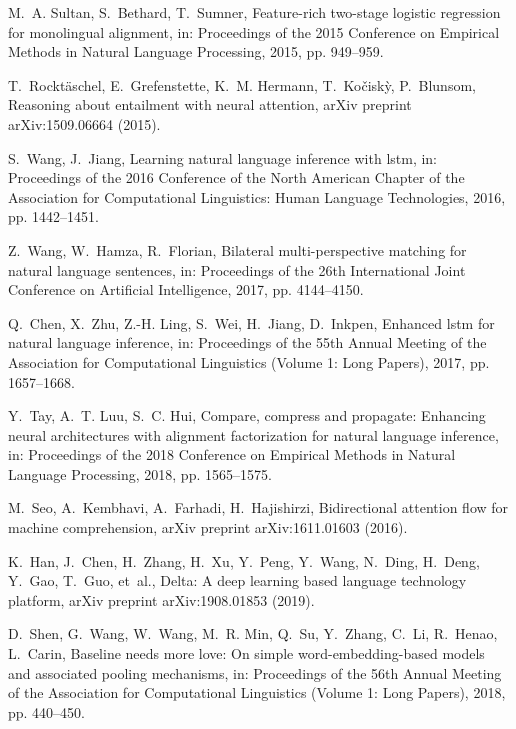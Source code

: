 \documentclass[review]{elsarticle}
\begin{document}
\begin{thebibliography}{10}
M.~A. Sultan, S.~Bethard, T.~Sumner, Feature-rich two-stage logistic regression
  for monolingual alignment, in: Proceedings of the 2015 Conference on
  Empirical Methods in Natural Language Processing, 2015, pp. 949--959.

T.~Rockt{\"a}schel, E.~Grefenstette, K.~M. Hermann, T.~Ko{\v{c}}isk{\`y},
  P.~Blunsom, Reasoning about entailment with neural attention, arXiv preprint
  arXiv:1509.06664 (2015).

S.~Wang, J.~Jiang, Learning natural language inference with lstm, in:
  Proceedings of the 2016 Conference of the North American Chapter of the
  Association for Computational Linguistics: Human Language Technologies, 2016,
  pp. 1442--1451.

Z.~Wang, W.~Hamza, R.~Florian, Bilateral multi-perspective matching for natural
  language sentences, in: Proceedings of the 26th International Joint
  Conference on Artificial Intelligence, 2017, pp. 4144--4150.

Q.~Chen, X.~Zhu, Z.-H. Ling, S.~Wei, H.~Jiang, D.~Inkpen, Enhanced lstm for
  natural language inference, in: Proceedings of the 55th Annual Meeting of the
  Association for Computational Linguistics (Volume 1: Long Papers), 2017, pp.
  1657--1668.

Y.~Tay, A.~T. Luu, S.~C. Hui, Compare, compress and propagate: Enhancing neural
  architectures with alignment factorization for natural language inference,
  in: Proceedings of the 2018 Conference on Empirical Methods in Natural
  Language Processing, 2018, pp. 1565--1575.

M.~Seo, A.~Kembhavi, A.~Farhadi, H.~Hajishirzi, Bidirectional attention flow
  for machine comprehension, arXiv preprint arXiv:1611.01603 (2016).

K.~Han, J.~Chen, H.~Zhang, H.~Xu, Y.~Peng, Y.~Wang, N.~Ding, H.~Deng, Y.~Gao,
  T.~Guo, et~al., Delta: A deep learning based language technology platform,
  arXiv preprint arXiv:1908.01853 (2019).

D.~Shen, G.~Wang, W.~Wang, M.~R. Min, Q.~Su, Y.~Zhang, C.~Li, R.~Henao,
  L.~Carin, Baseline needs more love: On simple word-embedding-based models and
  associated pooling mechanisms, in: Proceedings of the 56th Annual Meeting of
  the Association for Computational Linguistics (Volume 1: Long Papers), 2018,
  pp. 440--450.


\end{thebibliography}
\end{document}
